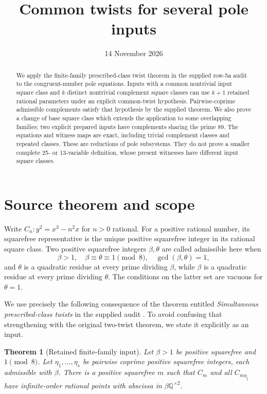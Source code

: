 \documentclass[11pt,a4paper]{article}
\title{Common twists for several pole inputs}
\author{}\date{14 November 2026}
\newtheorem{theorem}{Theorem}[section]\newtheorem{lemma}[theorem]{Lemma}
\theoremstyle{definition}\newtheorem{definition}[theorem]{Definition}
\theoremstyle{remark}\newtheorem{remark}[theorem]{Remark}
\newcommand{\Q}{\mathbb Q}\newcommand{\Z}{\mathbb Z}
\begin{document}
\maketitle
\begin{abstract}
We apply the finite-family prescribed-class twist theorem in the supplied
row-5a audit to the congruent-number pole equations. Inputs with a common
nontrivial input square class and $k$ distinct nontrivial complement square
classes can use $k+1$ retained rational parameters under an explicit common-twist
hypothesis. Pairwise-coprime admissible complements satisfy that hypothesis
by the supplied theorem. We also prove a change of base square class which
extends the application to some overlapping families; two explicit prepared
inputs have complements sharing the prime 89. The equations and witness maps
are exact, including trivial complement classes and repeated classes.
These are reductions of pole subsystems. They do not prove a smaller complete
25- or 13-variable definition, whose present witnesses have different input
square classes.
\end{abstract}

\section{Source theorem and scope}
Write $C_n:y^2=x^3-n^2x$ for $n>0$ rational. For a positive rational
number, its squarefree representative is the unique positive squarefree
integer in its rational square class. Two positive squarefree integers
$\beta,\theta$ are called admissible here when
\[
 \beta>1,\quad\beta\equiv\theta\equiv1\pmod8,\quad
 \gcd(\beta,\theta)=1,
\]
and $\theta$ is a quadratic residue at every prime dividing $\beta$,
while $\beta$ is a quadratic residue at every prime dividing $\theta$.
The conditions on the latter set are vacuous for $\theta=1$.

We use precisely the following consequence of the theorem entitled
\emph{Simultaneous prescribed-class twists} in the supplied audit
\cite{Audit}.
To avoid confusing that strengthening with the original two-twist theorem,
we state it explicitly as an input.

\begin{theorem}[Retained finite-family input]\label{thm:input}
Let $\beta>1$ be positive squarefree and $1\pmod8$. Let
$\eta_1,\ldots,\eta_s$ be pairwise coprime positive squarefree
integers, each admissible with $\beta$. There is a positive squarefree
$m$ such that $C_m$ and all $C_{m\eta_j}$ have infinite-order rational
points with abscissa in $\beta\Q^{\times2}$.
\end{theorem}
\end{document}
